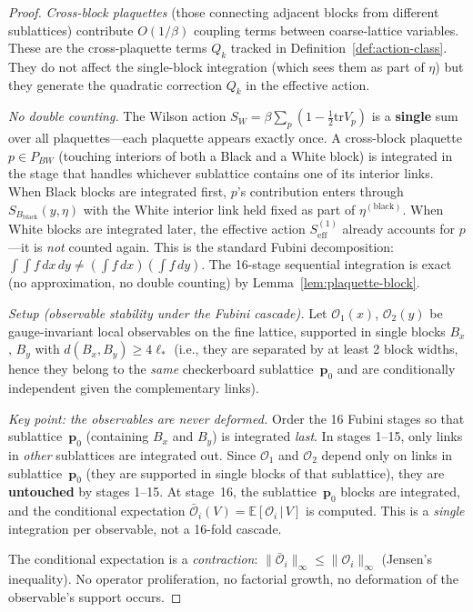 \documentclass[11pt]{article}
\theoremstyle{definition}
\newcommand{\tr}{\mathrm{tr}}
\begin{document}
\begin{proof}
\emph{Cross-block plaquettes} (those connecting adjacent blocks
from different sublattices) contribute $O(1/\beta)$
coupling terms between coarse-lattice variables.
These are the cross-plaquette terms $Q_k$ tracked in
Definition~\ref{def:action-class}.  They do not affect
the single-block integration (which sees them as part
of $\eta$) but they generate the quadratic correction
$Q_k$ in the effective action.

\emph{No double counting.}
The Wilson action $S_W=\beta\sum_p(1-\frac{1}{2}\tr V_p)$ is
a \textbf{single} sum over all plaquettes---each plaquette
appears exactly once.  A cross-block plaquette $p\in P_{BW}$
(touching interiors of both a Black and a White block) is
integrated in the stage that handles whichever sublattice
contains one of its interior links.  When Black blocks are
integrated first, $p$'s contribution enters through
$S_{B_{\mathrm{black}}}(y,\eta)$ with the White interior link
held fixed as part of $\eta^{(\mathrm{black})}$.
When White blocks are integrated later, the effective action
$S_{\mathrm{eff}}^{(1)}$ already accounts for $p$---it is
\emph{not} counted again.  This is the standard Fubini
decomposition: $\int\int f\,dx\,dy\ne(\int f\,dx)(\int f\,dy)$.
The 16-stage sequential integration is exact (no approximation,
no double counting) by Lemma~\ref{lem:plaquette-block}.

\emph{Setup (observable stability under the Fubini cascade).}
Let $\mathcal{O}_1(x)$, $\mathcal{O}_2(y)$ be gauge-invariant local
observables on the fine lattice, supported in single blocks
$B_x$, $B_y$ with $d(B_x,B_y)\ge 4\ell_*$ (i.e., they are
separated by at least 2 block widths, hence they belong to
the \emph{same} checkerboard sublattice~$\mathbf{p}_0$
and are conditionally independent given the complementary links).

\emph{Key point: the observables are never deformed.}
Order the 16 Fubini stages so that sublattice~$\mathbf{p}_0$
(containing $B_x$ and $B_y$) is integrated \emph{last}.
In stages 1--15, only links in \emph{other} sublattices are
integrated out.  Since $\mathcal{O}_1$ and $\mathcal{O}_2$
depend only on links in sublattice~$\mathbf{p}_0$
(they are supported in single blocks of that sublattice),
they are \textbf{untouched} by stages 1--15.
At stage~16, the sublattice~$\mathbf{p}_0$ blocks are
integrated, and the conditional expectation
$\bar{\mathcal{O}}_i(V)=\mathbb{E}[\mathcal{O}_i\,|\,V]$
is computed.  This is a \emph{single} integration per
observable, not a 16-fold cascade.

The conditional expectation is a \emph{contraction}:
$\|\bar{\mathcal{O}}_i\|_\infty\le\|\mathcal{O}_i\|_\infty$
(Jensen's inequality).  No operator proliferation, no
factorial growth, no deformation of the observable's
support occurs.


\end{proof}
\end{document}
